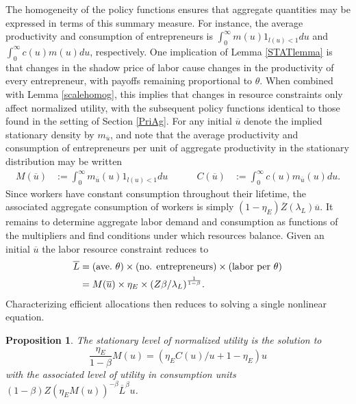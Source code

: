 \documentclass[11pt]{article}
\theoremstyle{plain}
\newtheorem{prop}[thm]{Proposition}
\begin{document}
The homogeneity of the policy functions ensures that aggregate quantities may be expressed in terms of this summary measure. For instance, the average productivity and consumption of entrepreneurs is $\int_{0}^{\infty}m(u)1_{l(u)<1} du$ and $\int_{0}^{\infty}c(u)m(u) du$, respectively. One implication of Lemma \ref{STATlemma} is that changes in the shadow price of labor cause changes in the productivity of every entrepreneur, with payoffs remaining proportional to $\theta$. When combined with Lemma \ref{scalehomog}, this implies that changes in resource constraints only affect normalized utility, with the subsequent policy functions identical to those found in the setting of Section \ref{PriAg}. For any initial $\overline{u}$ denote the implied stationary density by $m_{\overline{u}}$, and note that the average productivity and consumption of entrepreneurs per unit of aggregate productivity in the stationary distribution may be written
\begin{equation}
\begin{aligned}
M(\overline{u}) & := \int_{0}^{\infty}m_{\overline{u}}(u)1_{l(u)<1}du \ \ \ \ \ & \ \ \ \ \
C(\overline{u}) & := \int_{0}^{\infty}c(u)m_{\overline{u}}(u)du.
\label{Output}
\end{aligned}
\end{equation} 
Since workers have constant consumption throughout their lifetime, the associated aggregate consumption of workers is simply $(1-\eta_E)\overline{Z}(\lambda_L)\overline{u}$. It remains to determine aggregate labor demand and consumption as functions of the multipliers and find conditions under which resources balance. Given an initial $\overline{u}$ the labor resource constraint reduces to
\begin{equation}
\begin{aligned}
\overline{L} & = (\textnormal{ave.} \ \theta) \times \textnormal{(no. entrepreneurs)} \times \textnormal{(labor per $\theta$)}
\\ & = M(\overline{u}) \times \eta_E \times {\left(Z\beta/\lambda_L\right)}^{\frac{1}{1-\beta}}.
\end{aligned}
\label{LRcons7}
\end{equation}
Characterizing efficient allocations then reduces to solving a single nonlinear equation. 
\begin{prop}\label{STAT1}
The stationary level of normalized utility is the solution to 
\begin{equation}
\frac{\eta_E}{1-\beta}M(u) = (\eta_EC(u)/u + 1 - \eta_E)u
\label{STATy}
\end{equation}
with the associated level of utility in consumption units $(1-\beta)Z(\eta_EM(u))^{-\beta}\overline{L}^{\beta}u$. 
\end{prop}
\end{document}
